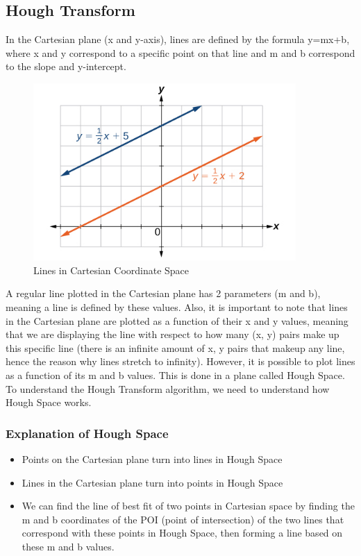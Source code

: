 \subsection{Hough Transform}
\par In the Cartesian plane (x and y-axis), lines are defined by the formula y=mx+b, where x and y correspond to a specific point on that line and m and b correspond to the slope and y-intercept.
\begin{figure}[h!]
\centering
\includegraphics[width=10cm]{./Figures/hough_transform.jpeg}
\caption{Lines in Cartesian Coordinate Space}
\label{Lines_in_Cartesian_Coordinate_Space}
\end{figure}
\par A regular line plotted in the Cartesian plane has 2 parameters (m and b), meaning a line is defined by these values. Also, it is important to note that lines in the Cartesian plane are plotted as a function of their x and y values, meaning that we are displaying the line with respect to how many (x, y) pairs make up this specific line (there is an infinite amount of x, y pairs that makeup any line, hence the reason why lines stretch to infinity).
However, it is possible to plot lines as a function of its m and b values. This is done in a plane called Hough Space. To understand the Hough Transform algorithm, we need to understand how Hough Space works.
\subsubsection{Explanation of Hough Space}
\begin{itemize}
    \item Points on the Cartesian plane turn into lines in Hough Space
    \item Lines in the Cartesian plane turn into points in Hough Space
    \item We can find the line of best fit of two points in Cartesian space by finding the m and b coordinates of the POI (point of intersection) of the two lines that correspond with these points in Hough Space, then forming a line based on these m and b values.
\end{itemize}

